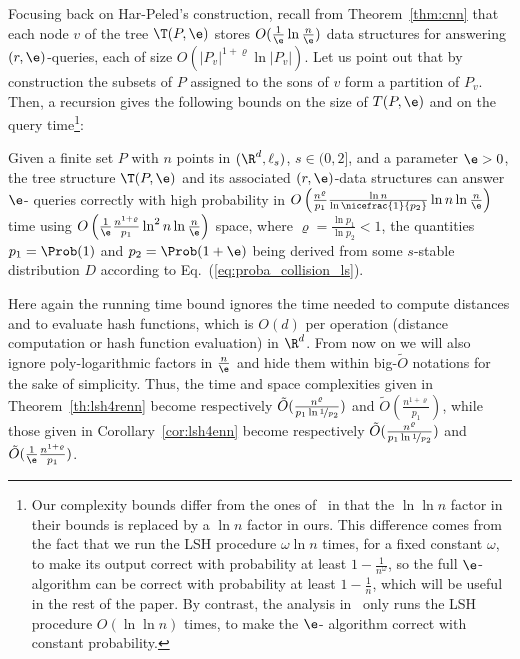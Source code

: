 Focusing back on Har-Peled's construction, recall from
Theorem~\ref{thm:cnn} that each node $v$ of the tree $\T(P,\e)$ stores
$O(\frac{1}{\e}\ln\frac{n}{\e})$ data structures for answering
$(r,\e)$-\pleb queries, each of size $O(|P_v|^{1+\varrho}\ln
|P_v|)$. Let us point out that by construction the subsets of $P$
assigned to the sons of $v$ form a partition of $P_v$. Then, a
recursion gives the following bounds on the size of $T(P,\e)$ and on
the query time\footnote{Our complexity bounds differ from
  the ones of~\citet{HarPeledIndykMotwani} in that the $\ln \ln n$
  factor in their bounds is replaced by a $\ln n$ factor in ours. This
  difference comes from the fact that we run the LSH procedure
  $\omega\ln n$ times, for a fixed constant $\omega$, to make
  its output correct with probability at least $1-\frac{1}{n^\omega}$,
  so the full $\e$-\nn algorithm can be correct with probability at
  least $1-\frac{1}{n}$, which will be useful in the rest of the
  paper. By contrast, the analysis in~\cite{HarPeledIndykMotwani} only
  runs the LSH procedure $O(\ln \ln n)$ times, to make the $\e$-\nn
  algorithm correct with constant probability.}:
\begin{cor}\label{cor:lsh4enn}
  Given a finite set $P$ with $n$ points in $(\R^d, \ell_s)$, $s\in
  (0,2]$, and a parameter $\e > 0$, the tree structure $\T(P,\e)$ and
  its associated $(r,\e)$-\pleb data structures can answer $\e$-\nn
  queries correctly with high probability in
  $O\left(\frac{n^{\varrho}}{p_1}\frac{\ln n}{\ln \nicefrac{1}{p_2}} \ln n
  \ln\frac{n}{\e}\right)$ time using
  $O\left(\frac{1}{\e}\frac{n^{1+\varrho}}{p_1}\ln^2 n\ln \frac{n}{\e}\right)$
  space, where $\varrho = \frac{\ln p_1}{\ln p_2}<1$, the quantities
  $p_1=\Prob(1)$ and $p_2=\Prob(1+\e)$ being derived from some $s$-stable
  distribution $D$ according to Eq.~(\ref{eq:proba_collision_ls}).
\end{cor}
Here again the running time bound ignores the time needed to compute
distances and to evaluate hash functions, which is $O(d)$ per
operation (distance computation or hash function evaluation) in
$\R^d$. From now on we will also ignore poly-logarithmic factors in
$\frac{n}{\e}$ and hide them within big-$\tilde O$ notations for the
sake of simplicity. Thus, the time and space complexities given in
Theorem~\ref{th:lsh4renn} become respectively $\tilde
O(\frac{n^\varrho}{p_1\ln\nicefrac{1}{p_2}})$ and $\tilde
O(\frac{n^{1+\varrho}}{p_1})$, while those given in Corollary~\ref{cor:lsh4enn}
become respectively $\tilde O(\frac{n^\varrho}{p_1\ln\nicefrac{1}{p_2}})$
and $\tilde O(\frac{1}{\e}\frac{n^{1+\varrho}}{p_1})$.

